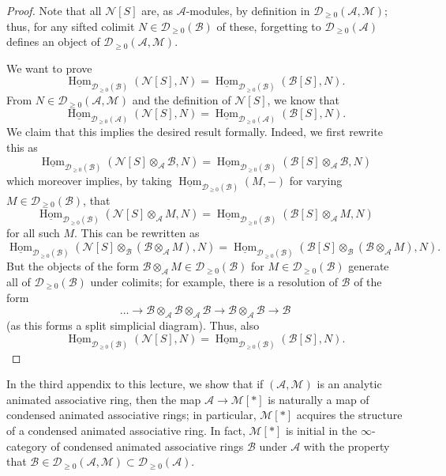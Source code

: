 \documentclass[11pt]{amsbook}
\DeclareMathOperator{\Hom}{Hom}
\newcommand{\intHom}{\underline{\Hom}}
\numberwithin{equation}{section}
\numberwithin{theorem}{section}
\theoremstyle{definition}
\begin{document}
\begin{proof} Note that all $\mathcal N[S]$ are, as $\mathcal A$-modules, by definition in $\mathcal D_{\geq 0}(\mathcal A,\mathcal M)$; thus, for any sifted colimit $N\in \mathcal D_{\geq 0}(\mathcal B)$ of these, forgetting to $\mathcal D_{\geq 0}(\mathcal A)$ defines an object of $\mathcal D_{\geq 0}(\mathcal A,\mathcal M)$.

We want to prove
\[
\intHom_{\mathcal D_{\geq 0}(\mathcal B)}(\mathcal N[S],N) = \intHom_{\mathcal D_{\geq 0}(\mathcal B)}(\mathcal B[S],N).
\]
From $N\in \mathcal D_{\geq 0}(\mathcal A,\mathcal M)$ and the definition of $\mathcal N[S]$, we know that
\[
\intHom_{\mathcal D_{\geq 0}(\mathcal A)}(\mathcal N[S],N) = \intHom_{\mathcal D_{\geq 0}(\mathcal A)}(\mathcal B[S],N).
\]
We claim that this implies the desired result formally. Indeed, we first rewrite this as
\[
\intHom_{\mathcal D_{\geq 0}(\mathcal B)}(\mathcal N[S]\otimes_{\mathcal A}\mathcal B,N) = \intHom_{\mathcal D_{\geq 0}(\mathcal B)}(\mathcal B[S]\otimes_{\mathcal A}\mathcal B,N)
\]
which moreover implies, by taking $\intHom_{\mathcal D_{\geq 0}(\mathcal B)}(M,-)$ for varying $M\in \mathcal D_{\geq 0}(\mathcal B)$, that
\[
\intHom_{\mathcal D_{\geq 0}(\mathcal B)}(\mathcal N[S]\otimes_{\mathcal A}M,N) = \intHom_{\mathcal D_{\geq 0}(\mathcal B)}(\mathcal B[S]\otimes_{\mathcal A}M,N)
\]
for all such $M$. This can be rewritten as
\[
\intHom_{\mathcal D_{\geq 0}(\mathcal B)}(\mathcal N[S]\otimes_{\mathcal B} (\mathcal B\otimes_{\mathcal A}M),N) = \intHom_{\mathcal D_{\geq 0}(\mathcal B)}(\mathcal B[S]\otimes_{\mathcal B} (\mathcal B\otimes_{\mathcal A}M),N).
\]
But the objects of the form $\mathcal B\otimes_{\mathcal A} M\in \mathcal D_{\geq 0}(\mathcal B)$ for $M\in \mathcal D_{\geq 0}(\mathcal B)$ generate all of $\mathcal D_{\geq 0}(\mathcal B)$ under colimits; for example, there is a resolution of $\mathcal B$ of the form
\[
\ldots \to\mathcal B\otimes_{\mathcal A}\mathcal B\otimes_{\mathcal A}\mathcal B\to \mathcal B\otimes_{\mathcal A}\mathcal B\to \mathcal B
\]
(as this forms a split simplicial diagram). Thus, also
\[
\intHom_{\mathcal D_{\geq 0}(\mathcal B)}(\mathcal N[S],N) = \intHom_{\mathcal D_{\geq 0}(\mathcal B)}(\mathcal B[S],N).
\]
\end{proof}

In the third appendix to this lecture, we show that if $(\mathcal A,\mathcal M)$ is an analytic animated associative ring, then the map $\mathcal A\to \mathcal M[\ast]$ is naturally a map of condensed animated associative rings; in particular, $\mathcal M[\ast]$ acquires the structure of a condensed animated associative ring. In fact, $\mathcal M[\ast]$ is initial in the $\infty$-category of condensed animated associative  rings $\mathcal B$ under $\mathcal A$ with the property that $\mathcal B\in \mathcal D_{\geq 0}(\mathcal A,\mathcal M)\subset \mathcal D_{\geq 0}(\mathcal A)$.
\end{document}
